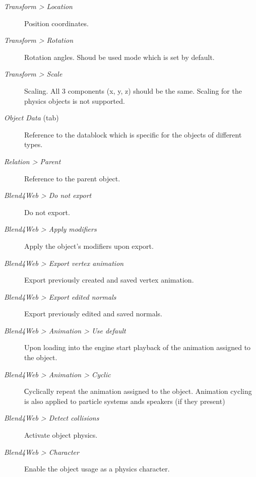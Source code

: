 \documentclass[a4paper,12pt,oneside]{sphinxmanual}
\begin{document}
\begin{description}
\item[{\emph{Transform \textgreater{} Location}}] \leavevmode
Position coordinates.

\item[{\emph{Transform \textgreater{} Rotation}}] \leavevmode
Rotation angles. Shoud be used  mode which is set by default.

\item[{\emph{Transform \textgreater{} Scale}}] \leavevmode
Scaling. All 3 components (x, y, z) should be the same. Scaling for the physics objects is not supported.

\item[{\emph{Object Data} (tab)}] \leavevmode
Reference to the datablock which is specific for the objects of different types.

\item[{\emph{Relation \textgreater{} Parent}}] \leavevmode
Reference to the parent object.

\item[{\emph{Blend4Web \textgreater{} Do not export}}] \leavevmode
Do not export.

\item[{\emph{Blend4Web \textgreater{} Apply modifiers}}] \leavevmode
Apply the object's modifiers upon export.

\item[{\emph{Blend4Web \textgreater{} Export vertex animation}}] \leavevmode
Export previously created and saved vertex animation.

\item[{\emph{Blend4Web \textgreater{} Export edited normals}}] \leavevmode
Export previously edited and saved normals.

\item[{\emph{Blend4Web \textgreater{} Animation \textgreater{} Use default}}] \leavevmode
Upon loading into the engine start playback of the animation assigned to the object.

\item[{\emph{Blend4Web \textgreater{} Animation \textgreater{} Cyclic}}] \leavevmode
Сyclically repeat the animation assigned to the object. Animation cycling is also applied to particle systems ands speakers (if they present)

\item[{\emph{Blend4Web \textgreater{} Detect collisions}}] \leavevmode
Activate object physics.

\item[{\emph{Blend4Web \textgreater{} Character}}] \leavevmode
Enable the object usage as a physics character.


\end{description}
\end{document}
